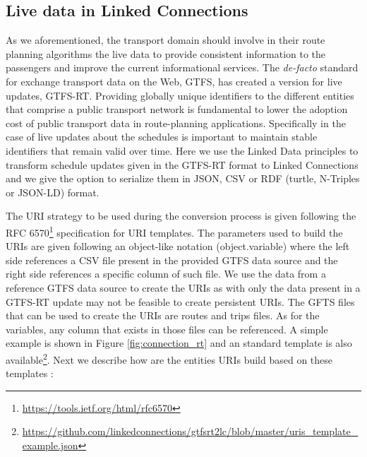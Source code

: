 \documentclass[sw]{iosart2x}
\begin{document}
	\subsection{Live data in Linked Connections}\label{real_time_lc}
	
	As we aforementioned, the transport domain should involve in their route planning algorithms the live data to provide consistent information to the passengers and improve the current informational services. The \textit{de-facto} standard for exchange transport data on the Web, GTFS, has created a version for live updates, GTFS-RT. Providing globally unique identifiers to the different entities that comprise a public transport network is fundamental to lower the adoption cost of public transport data in route-planning applications. Specifically in the case of live updates about the schedules is important to maintain stable identifiers that remain valid over time. Here we use the Linked Data principles to transform schedule updates given in the GTFS-RT format to Linked Connections and we give the option to serialize them in JSON, CSV or RDF (turtle, N-Triples or JSON-LD) format.
	
	The URI strategy to be used during the conversion process is given following the RFC 6570\footnote{\url{https://tools.ietf.org/html/rfc6570}} specification for URI templates. The parameters used to build the URIs are given following an object-like notation (object.variable) where the left side references a CSV file present in the provided GTFS data source and the right side references a specific column of such file. We use the data from a reference GTFS data source to create the URIs as with only the data present in a GTFS-RT update may not be feasible to create persistent URIs. The GFTS files that can be used to create the URIs are routes and trips files. As for the variables, any column that exists in those files can be referenced. A simple example is shown in Figure \ref{fig:connection_rt} and an standard template is also available\footnote{\url{https://github.com/linkedconnections/gtfsrt2lc/blob/master/uris_template_example.json}}. Next we describe how are the entities URIs build based on these templates :
	
\end{document}
